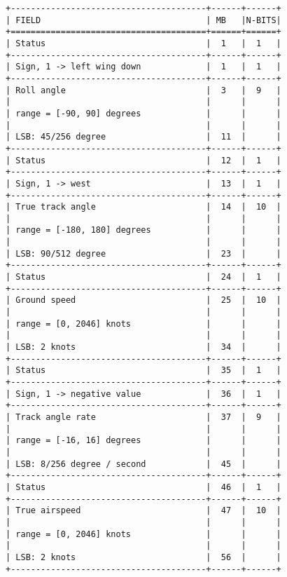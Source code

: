 \begin{verbatim}
+---------------------------------------+------+------+
| FIELD                                 | MB   |N-BITS|
+=======================================+======+======+
| Status                                |  1   |  1   |
+---------------------------------------+------+------+
| Sign, 1 -> left wing down             |  1   |  1   |
+---------------------------------------+------+------+
| Roll angle                            |  3   |  9   |
|                                       |      |      |
| range = [-90, 90] degrees             |      |      |
|                                       |      |      |
| LSB: 45/256 degree                    |  11  |      |
+---------------------------------------+------+------+
| Status                                |  12  |  1   |
+---------------------------------------+------+------+
| Sign, 1 -> west                       |  13  |  1   |
+---------------------------------------+------+------+
| True track angle                      |  14  |  10  |
|                                       |      |      |
| range = [-180, 180] degrees           |      |      |
|                                       |      |      |
| LSB: 90/512 degree                    |  23  |      |
+---------------------------------------+------+------+
| Status                                |  24  |  1   |
+---------------------------------------+------+------+
| Ground speed                          |  25  |  10  |
|                                       |      |      |
| range = [0, 2046] knots               |      |      |
|                                       |      |      |
| LSB: 2 knots                          |  34  |      |
+---------------------------------------+------+------+
| Status                                |  35  |  1   |
+---------------------------------------+------+------+
| Sign, 1 -> negative value             |  36  |  1   |
+---------------------------------------+------+------+
| Track angle rate                      |  37  |  9   |
|                                       |      |      |
| range = [-16, 16] degrees             |      |      |
|                                       |      |      |
| LSB: 8/256 degree / second            |  45  |      |
+---------------------------------------+------+------+
| Status                                |  46  |  1   |
+---------------------------------------+------+------+
| True airspeed                         |  47  |  10  |
|                                       |      |      |
| range = [0, 2046] knots               |      |      |
|                                       |      |      |
| LSB: 2 knots                          |  56  |      |
+---------------------------------------+------+------+
\end{verbatim}

